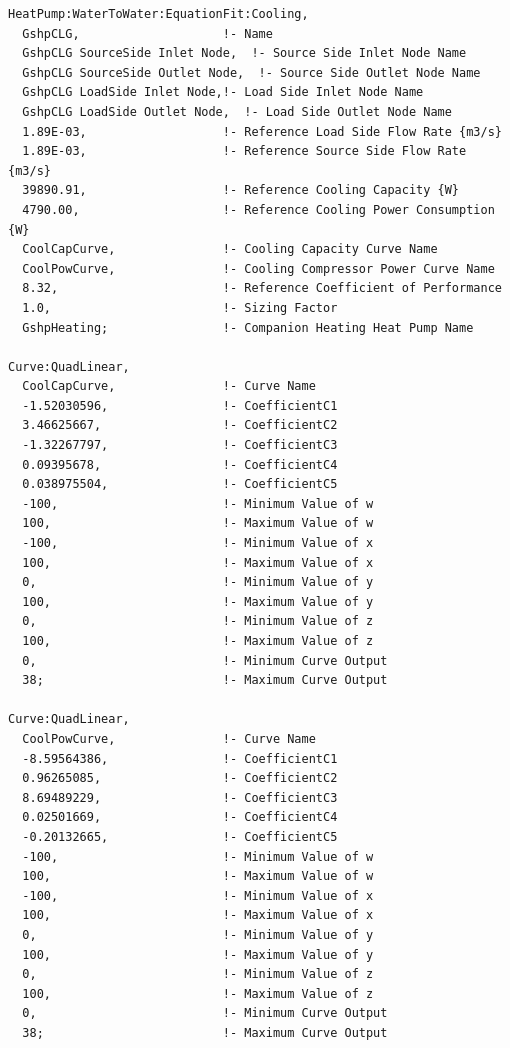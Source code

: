 \begin{lstlisting}
HeatPump:WaterToWater:EquationFit:Cooling,
  GshpCLG,                    !- Name
  GshpCLG SourceSide Inlet Node,  !- Source Side Inlet Node Name
  GshpCLG SourceSide Outlet Node,  !- Source Side Outlet Node Name
  GshpCLG LoadSide Inlet Node,!- Load Side Inlet Node Name
  GshpCLG LoadSide Outlet Node,  !- Load Side Outlet Node Name
  1.89E-03,                   !- Reference Load Side Flow Rate {m3/s}
  1.89E-03,                   !- Reference Source Side Flow Rate {m3/s}
  39890.91,                   !- Reference Cooling Capacity {W}
  4790.00,                    !- Reference Cooling Power Consumption {W}
  CoolCapCurve,               !- Cooling Capacity Curve Name
  CoolPowCurve,               !- Cooling Compressor Power Curve Name
  8.32,                       !- Reference Coefficient of Performance
  1.0,                        !- Sizing Factor
  GshpHeating;                !- Companion Heating Heat Pump Name

Curve:QuadLinear,
  CoolCapCurve,               !- Curve Name
  -1.52030596,                !- CoefficientC1
  3.46625667,                 !- CoefficientC2
  -1.32267797,                !- CoefficientC3
  0.09395678,                 !- CoefficientC4
  0.038975504,                !- CoefficientC5
  -100,                       !- Minimum Value of w
  100,                        !- Maximum Value of w
  -100,                       !- Minimum Value of x
  100,                        !- Maximum Value of x
  0,                          !- Minimum Value of y
  100,                        !- Maximum Value of y
  0,                          !- Minimum Value of z
  100,                        !- Maximum Value of z
  0,                          !- Minimum Curve Output
  38;                         !- Maximum Curve Output

Curve:QuadLinear,
  CoolPowCurve,               !- Curve Name
  -8.59564386,                !- CoefficientC1
  0.96265085,                 !- CoefficientC2
  8.69489229,                 !- CoefficientC3
  0.02501669,                 !- CoefficientC4
  -0.20132665,                !- CoefficientC5
  -100,                       !- Minimum Value of w
  100,                        !- Maximum Value of w
  -100,                       !- Minimum Value of x
  100,                        !- Maximum Value of x
  0,                          !- Minimum Value of y
  100,                        !- Maximum Value of y
  0,                          !- Minimum Value of z
  100,                        !- Maximum Value of z
  0,                          !- Minimum Curve Output
  38;                         !- Maximum Curve Output
\end{lstlisting}

